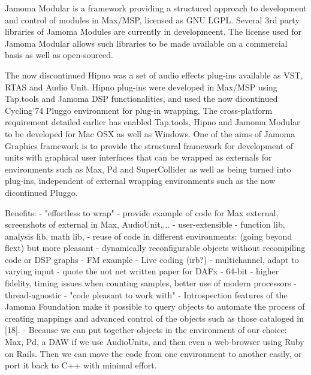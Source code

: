 \documentclass[twoside,10pt]{article}
\begin{document}
Jamoma Modular \cite{Place:2006} is a framework providing a structured approach to development and control of modules in Max/MSP, licensed as GNU LGPL. Several 3rd party libraries of Jamoma Modules are currently in developmeent. The license used for Jamoma Modular allows such libraries to be made available on a commercial basis as well as open-sourced.

The now discontinued Hipno\cite{Place:2005} was a set of audio effects plug-ins available as VST, RTAS and Audio Unit. Hipno plug-ins were developed in Max/MSP using Tap.tools and Jamoma DSP functionalities, and used the now dicontinued Cycling'74 Pluggo environment for plug-in wrapping. The cross-platform requirement detailed earlier has enabled Tap.tools, Hipno and Jamoma Modular to be developed for Mac OSX as well as Windows. One of the aims of Jamoma Graphics framework is to provide the structural framework for development of units with graphical user interfaces that can be wrapped as externals for environments such as Max, Pd and SuperCollider as well as being turned into plug-ins, independent of external wrapping environments such as the now dicontinued Pluggo.


    Benefits:
        - "effortless to wrap" -  provide example of code for Max external, screenshots of external in Max, AudioUnit,...
        - user-extensible - function lib, analysis lib, math lib, 
        - reuse of code in different environments: (going beyond flext) but more pleasant
        - dynamically reconfigurable objects without recompiling code or DSP graphs
            - FM example
            - Live coding (irb?)
        - multichannel, adapt to varying input  - quote the not net written paper for DAFx
        - 64-bit - higher fidelity, timing issues when counting samples, better use of modern processors
        - thread-agnostic
        - "code pleasant to work with"
        - Introspection features of the Jamoma Foundation make it possible to query objects to automate the process of creating mappings and advanced control of the objects such as those cataloged in [18].
        - Because we can put together objects in the environment of our choice: Max, Pd, a DAW if we use AudioUnits, and then even a web-browser using Ruby on Rails. Then we can move the code from one environment to another easily, or port it back to C++ with minimal effort.
\end{document}
